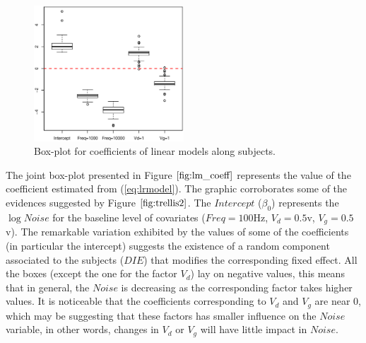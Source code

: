 \documentclass[sn-mathphys]{sn-jnl}%
\theoremstyle{thmstyleone}%
\theoremstyle{thmstyletwo}%
\theoremstyle{thmstylethree}%
\begin{document}
\begin{figure}[ht]
	\centerline{
		\includegraphics[width=0.5\textwidth]{Fig3_lm_coeff.eps}}
	\caption{Box-plot for coefficients of linear models along subjects.}
	\label{fig:lm_coeff}
\end{figure}

The joint box-plot presented in Figure $\ref{fig:lm_coeff}$ represents the value of the coefficient estimated from (\ref{eq:lrmodel}). The graphic corroborates some of the evidences suggested by Figure $\ref{fig:trellis2}$. 
The $Intercept$ ($\beta_0$) represents the $\log Noise$ for the baseline level of covariates ($Freq=100$Hz, $V_d=0.5$v, $V_g=0.5$v).
The remarkable variation exhibited by the values of some of the coefficients (in particular the intercept) suggests the existence of a random component associated to the subjects ($DIE$) that modifies the corresponding fixed effect. 
All the boxes (except the one for the factor $V_d$) lay on negative values, this means that in general, the $Noise$ is decreasing as the corresponding factor takes higher values. 
It is noticeable that the coefficients corresponding to $V_d$ and $V_g$ are near 0, which may be suggesting that these factors has smaller influence on the $Noise$ variable, in other words, changes in $V_d$ or $V_g$ will have little impact in $Noise$.

\end{document}
